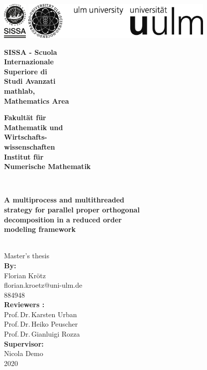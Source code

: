 \documentclass[a4paper,12pt,
headsepline,           %
oneside,               %
pointlessnumbers,      %
bibtotoc,              %
]{scrbook}
\makeatletter
\newcommand{\fullname}{Florian Krötz}
\newcommand{\email}{florian.kroetz@uni-ulm.de}
\newcommand{\titel}{A multiprocess and multithreaded\\ strategy for parallel proper orthogonal\\ decomposition in a reduced order\\ modeling framework}
\newcommand{\jahr}{2020}
\newcommand{\matnr}{884948}
\newcommand{\gutachterA}{Prof.\,Dr.\,Karsten Urban}
\newcommand{\gutachterB}{Prof.\,Dr.\,Heiko Peuscher}
\newcommand{\gutachterC}{Prof.\,Dr.\,Gianluigi Rozza}
\newcommand{\betreuer}{Nicola  Demo}
\newcommand{\fakultaet}{Mathematik und\\Wirtschafts-\\wissenschaften}
\newcommand{\institut}{Institut für\\ Numerische Mathematik}
\makeatother
\begin{document}
\frontmatter

\thispagestyle{empty}
\begin{addmargin*}[4mm]{-10mm}

\includegraphics[height=1.8cm]{images/sissaLogo}
\hfill
\includegraphics[height=1.8cm]{images/unilogo_sw}\\[1em]

{\footnotesize
\parbox[t]{35mm}{\bfseries SISSA - Scuola\\
	Internazionale\\
	Superiore di \\
	Studi Avanzati\\
	\mdseries mathlab, \\
	Mathematics Area}
\hspace*{80mm}
\parbox[t]{40mm}{\bfseries Fakultät für\\
\fakultaet\\
\mdseries \institut}\\[2cm]

\parbox{140mm}{\bfseries \LARGE \titel}\\[2em]
{\footnotesize Master's thesis}\\[3em]
{\footnotesize \bfseries By:}\\
{\footnotesize \fullname\\ \email}\\ \matnr\\[2em]
{\footnotesize \bfseries Reviewers :}\\                     
{\footnotesize \gutachterA\\ \gutachterB\\ \gutachterC}\\[2em]
{\footnotesize \bfseries Supervisor:}\\ 
{\footnotesize \betreuer}\\[2em]
{\footnotesize \jahr}
}
\end{addmargin*}
\end{document}

